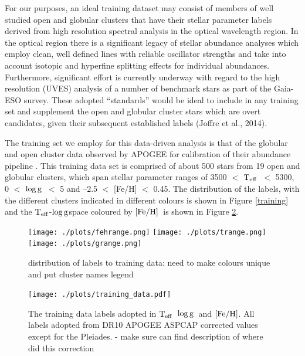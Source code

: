 \documentclass[12pt, preprint]{aastex}
\newcommand{\teff}{\mbox{$\rm T_{eff}$}}
\newcommand{\feh}{\mbox{$\rm [Fe/H]$}}
\newcommand{\logg}{\mbox{$\rm \log g$}}
\begin{document}
For our purposes, an ideal training dataset may consist of members of
well studied open and globular clusters that have their stellar
parameter labels derived from high resolution spectral analysis in the
optical wavelength region.
In the optical region there is a significant legacy of stellar abundance analyses which employ clean, well defined lines with reliable oscillator strengths and take into account isotopic and hyperfine splitting effects for individual abundances. Furthermore, significant effort is currently underway with regard to the high resolution (UVES) analysis of a number of benchmark stars as part of the Gaia-ESO survey. These adopted ``standards'' would be ideal to include in any training set and supplement the open and globular cluster stars which are overt candidates, given their subsequent established labels (Joffre et al., 2014). %

The training set we employ for this data-driven analysis is that of the globular and open cluster data observed by APOGEE for calibration of their abundance pipeline \citep{Meszaros2013}. This training data set is comprised of about 500 stars from 19 open and globular clusters, which span stellar parameter ranges of 3500 $<$ \teff\ $<$ 5300, 0 $<$ \logg\ $<$ 5 and --2.5 $<$ [Fe/H] $<$ 0.45. The distribution of the labels, with the different clusters indicated in different colours is shown in Figure \ref{training} and the \teff-\logg space coloured by \feh\ is shown in Figure \ref{fig:training_tgfeh}. 

\begin{figure}[h!]
  \texttt{[image: ./plots/fehrange.png]}
    \texttt{[image: ./plots/trange.png]}
      \texttt{[image: ./plots/grange.png]}
  \caption{distribution of labels to training data: need to make colours unique and put cluster names legend}
\label{fig:training}
\end{figure}

\begin{figure}[h!]
\centering
  \texttt{[image: ./plots/training\_data.pdf]}
\caption{The training data labels adopted in \teff\, \logg\ and \feh. All labels adopted from DR10 APOGEE ASPCAP corrected values except for the Pleiades. - make sure can find description of where did this correction }
\label{fig:training_tgfeh}
\end{figure}
\end{document}

